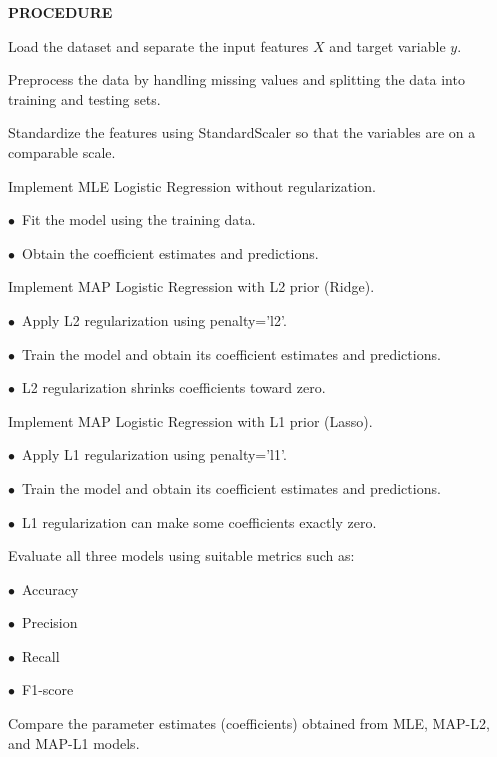 \documentclass[11pt,twoside]{article}
\newcommand{\expheading}[1]{{\fontsize{14}{17}\selectfont\textbf{#1}\par}}
\begin{document}
{\expheading{PROCEDURE}
\vspace{4pt}
\noindent Load the dataset and separate the input features $X$ and target variable $y$.\par
\noindent Preprocess the data by handling missing values and splitting the data into training and testing sets.\par
\noindent Standardize the features using StandardScaler so that the variables are on a comparable scale.\par
\noindent Implement MLE Logistic Regression without regularization.\par
\noindent\hspace*{0.55cm}$\bullet$~Fit the model using the training data.\par
\noindent\hspace*{0.55cm}$\bullet$~Obtain the coefficient estimates and predictions.\par
\noindent Implement MAP Logistic Regression with L2 prior (Ridge).\par
\noindent\hspace*{0.55cm}$\bullet$~Apply L2 regularization using penalty='l2'.\par
\noindent\hspace*{0.55cm}$\bullet$~Train the model and obtain its coefficient estimates and predictions.\par
\noindent\hspace*{0.55cm}$\bullet$~L2 regularization shrinks coefficients toward zero.\par
\noindent Implement MAP Logistic Regression with L1 prior (Lasso).\par
\noindent\hspace*{0.55cm}$\bullet$~Apply L1 regularization using penalty='l1'.\par
\noindent\hspace*{0.55cm}$\bullet$~Train the model and obtain its coefficient estimates and predictions.\par
\noindent\hspace*{0.55cm}$\bullet$~L1 regularization can make some coefficients exactly zero.\par
\noindent Evaluate all three models using suitable metrics such as:\par
\noindent\hspace*{0.55cm}$\bullet$~Accuracy\par
\noindent\hspace*{0.55cm}$\bullet$~Precision\par
\noindent\hspace*{0.55cm}$\bullet$~Recall\par
\noindent\hspace*{0.55cm}$\bullet$~F1-score\par
\noindent Compare the parameter estimates (coefficients) obtained from MLE, MAP-L2, and MAP-L1 models. \par
\vspace{4pt}

}
\end{document}
